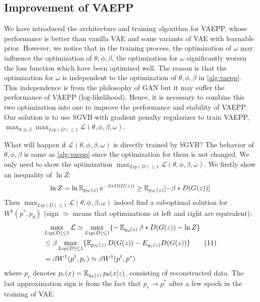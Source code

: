 \subsection{Improvement of VAEPP} \label{subsec:improve_of_vaepp}
We have introduced the architecture and training algorithm for VAEPP, whose performance is better than vanilla VAE and some variants of VAE with learnable prior. However, we notice that in the training process, the optimization of $\omega$ may influence the optimization of $\theta, \phi, \beta$, \EG the optimization for $\omega$ significantly worsen the loss function which have been optimized well. The reason is that the optimization for $\omega$ is independent to the optimization of $\theta, \phi, \beta$ in \cref{alg:vaepp}. This independence is from the philosophy of GAN but it may suffer the performance of VAEPP (log-likelihood). Hence, it is necessary to combine this two optimization into one to improve the performance and stability of VAEPP. Our solution is to use SGVB with gradient penalty regularizer to train VAEPP, \IE $\max_{\theta, \phi, \beta} \max_{Lip(D) \leq 1} \mathcal{L}(\theta, \phi, \beta, \omega)$. 

What will happen if $\mathcal{L}(\theta, \phi, \beta, \omega)$ is directly trained by SGVB? The behavior of $\theta, \phi, \beta$ is same as \cref{alg:vaepp} since the optimization for them is not changed. We only need to show the optimization $\max_{Lip(D) \leq 1} \mathcal{L}(\theta, \phi, \beta, \omega)$. We firstly show an inequality of $\ln Z$:
\begin{equation*}
	\ln Z = \ln \operatorname{\mathbb{E}}_{p_\mathcal{N}(z)} e^{- \beta * D(G(z))} \geq \operatorname{\mathbb{E}}_{p_\mathcal{N}(z)} [- \beta * D(G(z))]
\end{equation*}
Then $\max_{Lip(D) \leq 1} \mathcal{L}(\theta, \phi, \beta, \omega)$ indeed find a suboptimal solution for $W^1(p^*, p_\theta)$ (sign $\simeq$ means that optimizations at left and right are equivalent):
\begin{align*}\label{eq:improve_vaepp}
	&\max_{Lip(D) \leq 1} \mathcal{L} \simeq \max_{Lip(D) \leq 1} \{ -\operatorname{\mathbb{E}}_{q_\phi(z)} \beta*D(G(z)) - \ln Z \}\\ 
	&\leq \beta \max_{Lip(D) \leq 1} \{ \operatorname{\mathbb{E}}_{p_\mathcal{N}(z)} D(G(z)) - E_{q_\phi(z)} D(G(z)) \} \tag{11} \\
	&= \beta W^1(p^\dag, p_r) \approx \beta W^1(p^\dag, p^*) 
\end{align*}
where $p_r$ denotes $p_r(x) = \operatorname{\mathbb{E}}_{q_\phi(z)} p_\theta(x|z)$, consisting of reconstructed data. The last approximation sign is from the fact that $p_r \rightarrow p^*$ after a few epoch in the training of VAE. 

